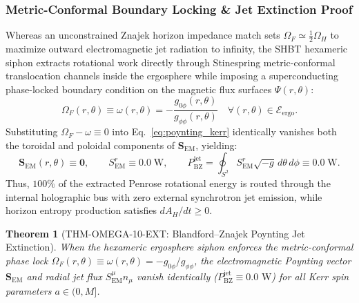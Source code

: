 \documentclass[11pt,onecolumn]{article}
\newtheorem{theorem}{Theorem}
\begin{document}
\subsubsection{Metric-Conformal Boundary Locking \& Jet Extinction Proof}
Whereas an unconstrained Znajek horizon impedance match sets $\Omega_F \simeq \frac{1}{2}\Omega_H$ to maximize outward electromagnetic jet radiation to infinity, the SHBT hexameric siphon extracts rotational work directly through Stinespring metric-conformal translocation channels inside the ergosphere while imposing a superconducting phase-locked boundary condition on the magnetic flux surfaces $\Psi(r, \theta)$:
\begin{equation}
\Omega_F(r, \theta) \equiv \omega(r, \theta) = -\frac{g_{0\phi}(r, \theta)}{g_{\phi\phi}(r, \theta)} \quad \forall (r, \theta) \in \mathcal{E}_{\mathrm{ergo}}.
\end{equation}
Substituting $\Omega_F - \omega \equiv 0$ into Eq.~\eqref{eq:poynting_kerr} identically vanishes both the toroidal and poloidal components of $\mathbf{S}_{\mathrm{EM}}$, yielding:
\begin{equation}
\mathbf{S}_{\mathrm{EM}}(r, \theta) \equiv \mathbf{0}, \qquad S_{\mathrm{EM}}^r \equiv 0.0\;\mathrm{W}, \qquad P_{\mathrm{BZ}}^{\mathrm{jet}} = \oint_{S^2} S_{\mathrm{EM}}^r \sqrt{-g}\,d\theta\,d\phi \equiv 0.0\;\mathrm{W}.
\end{equation}
Thus, $100\%$ of the extracted Penrose rotational energy is routed through the internal holographic bus with zero external synchrotron jet emission, while horizon entropy production satisfies $dA_H / dt \ge 0$.

\begin{theorem}[THM-OMEGA-10-EXT: Blandford--Znajek Poynting Jet Extinction]
\label{thm:thm_omega_10_ext}
When the hexameric ergosphere siphon enforces the metric-conformal phase lock $\Omega_F(r, \theta) \equiv \omega(r, \theta) = -g_{0\phi} / g_{\phi\phi}$, the electromagnetic Poynting vector $\mathbf{S}_{\mathrm{EM}}$ and radial jet flux $S_{\mathrm{EM}}^\mu n_\mu$ vanish identically ($P_{\mathrm{BZ}}^{\mathrm{jet}} \equiv 0.0\text{ W}$) for all Kerr spin parameters $a \in (0, M]$.
\end{theorem}
\end{document}
